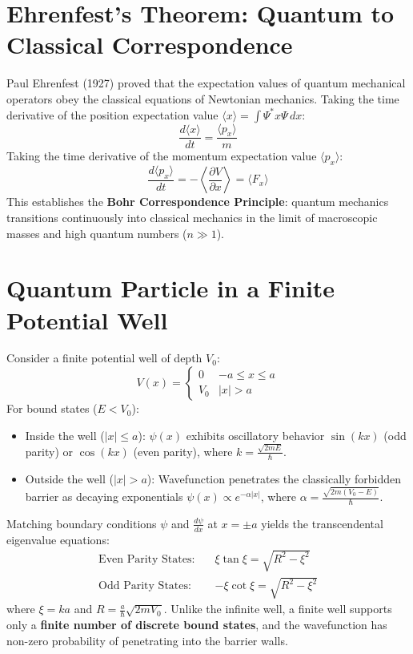 \section{Ehrenfest's Theorem: Quantum to Classical Correspondence}
Paul Ehrenfest (1927) proved that the expectation values of quantum mechanical operators obey the classical equations of Newtonian mechanics.
Taking the time derivative of the position expectation value $\langle x \rangle = \int \Psi^* x \Psi \, dx$:
\begin{equation}
\frac{d\langle x \rangle}{dt} = \frac{\langle p_x \rangle}{m}
\end{equation}
Taking the time derivative of the momentum expectation value $\langle p_x \rangle$:
\begin{equation}
\frac{d\langle p_x \rangle}{dt} = -\left\langle \frac{\partial V}{\partial x} \right\rangle = \langle F_x \rangle
\end{equation}
This establishes the \textbf{Bohr Correspondence Principle}: quantum mechanics transitions continuously into classical mechanics in the limit of macroscopic masses and high quantum numbers ($n \gg 1$).

\section{Quantum Particle in a Finite Potential Well}
Consider a finite potential well of depth $V_0$:
\begin{equation}
V(x) = \begin{cases} 0 & -a \le x \le a \\ V_0 & |x| > a \end{cases}
\end{equation}
For bound states ($E < V_0$):
\begin{itemize}[itemsep=2pt]
    \item Inside the well ($|x| \le a$): $\psi(x)$ exhibits oscillatory behavior $\sin(kx)$ (odd parity) or $\cos(kx)$ (even parity), where $k = \frac{\sqrt{2mE}}{\hbar}$.
    \item Outside the well ($|x| > a$): Wavefunction penetrates the classically forbidden barrier as decaying exponentials $\psi(x) \propto e^{-\alpha |x|}$, where $\alpha = \frac{\sqrt{2m(V_0 - E)}}{\hbar}$.
\end{itemize}
Matching boundary conditions $\psi$ and $\frac{d\psi}{dx}$ at $x = \pm a$ yields the transcendental eigenvalue equations:
\begin{align}
\text{Even Parity States:} \quad & \xi \tan\xi = \sqrt{R^2 - \xi^2} \\
\text{Odd Parity States:} \quad & -\xi \cot\xi = \sqrt{R^2 - \xi^2}
\end{align}
where $\xi = ka$ and $R = \frac{a}{\hbar}\sqrt{2m V_0}$.
Unlike the infinite well, a finite well supports only a \textbf{finite number of discrete bound states}, and the wavefunction has non-zero probability of penetrating into the barrier walls.

